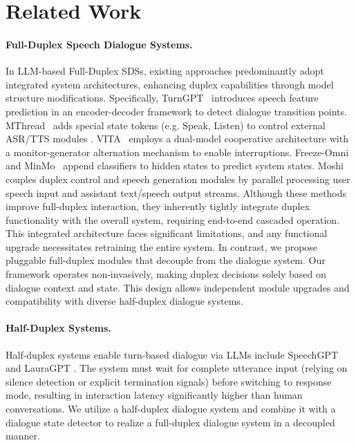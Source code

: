 \documentclass[11pt]{article}
\begin{document}
\section{Related Work}

\paragraph{Full-Duplex Speech Dialogue Systems.}
 
In LLM-based Full-Duplex SDSs, existing approaches predominantly adopt integrated system architectures, enhancing duplex capabilities through model structure modifications.
Specifically, TurnGPT~\cite{ekstedt2020turngpt} introduces speech feature prediction in an encoder-decoder framework to detect dialogue transition points. MThread~\cite{wang2024fullduplexspeechdialoguescheme} adds special state tokens (e.g. Speak, Listen) to control external ASR/TTS modules \cite{baevski2020wav2vec}.
VITA~\cite{fu2024vitaopensourceinteractiveomni} employs a dual-model cooperative architecture with a monitor-generator alternation mechanism to enable interruptions.
Freeze-Omni~\cite{wang2024freezeomnismartlowlatency} and MinMo~\cite{chen2025MinMomultimodallargelanguage} append classifiers to hidden states to predict system states.
Moshi~\cite{défossez2024moshispeechtextfoundationmodel} couples duplex control and speech generation modules by parallel processing user speech input and assistant text/speech output streams.
Although these methods improve full-duplex interaction, they inherently tightly integrate duplex functionality with the overall system, requiring end-to-end cascaded operation. This integrated architecture faces significant limitations, and any functional upgrade necessitates retraining the entire system. 
In contrast, we propose pluggable full-duplex modules that decouple from the dialogue system. 
Our framework operates non-invasively, making duplex decisions solely based on dialogue context and state. This design allows independent module upgrades and compatibility with diverse half-duplex dialogue systems.

\paragraph{Half-Duplex Systems.} Half-duplex systems enable turn-based dialogue via LLMs include SpeechGPT \cite{zhang2023speechgptempoweringlargelanguage} and LauraGPT \cite{du2024lauragptlistenattendunderstand}. The system must wait for complete utterance input (relying on silence detection or explicit termination signals) before switching to response mode, resulting in interaction latency significantly higher than human conversations.
We utilize a half-duplex dialogue system and combine it with a dialogue state detector to realize a full-duplex dialogue system in a decoupled manner.
\end{document}
